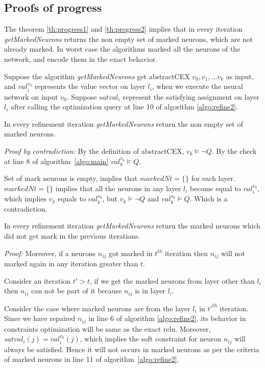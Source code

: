 \subsection{Proofs of progress}
The theorem \ref{th:progress1} and \ref{th:progress2} implies that in every iteration {\em getMarkedNeurons} 
returns the non empty set of marked neurons, which are not already marked. In worst case the algorithms marked all 
the neurons of the network, and encode them in the exact behavior. 

Suppose the algorithm {\em getMarkedNeurons} get abstractCEX 
${v_0}, {v_1}, ... {v_k}$ as input, 
and ${val_i^{{v_0}}}$ represents the value vector on layer $l_i$, 
when we execute the neural network on input ${v_0}$.
Suppose ${satval_i}$ represent the satisfying assignment on layer $l_i$ after calling the optimization 
query at line 10 of algorithm \ref{algo:refine2}. 



\begin{theorem}
  \label{th:progress1}
  In every refinement iteration {\em getMarkedNeurons} return the non empty set of marked neurons. 
\end{theorem}

{\em Proof by contradiction:} 
By the definition of abstractCEX, ${v_k} \models \lnot Q$. 
By the check at line 8 of algorithm~\ref{algo:main} ${val_k^{{v_0}}} \models Q$. 

Set of mark neurons is empty, implies that $markedNt = \{\}$ for each layer. 
$markedNt= \{\}$ implies that all the neurons in any layer $l_i$ become equal to ${val_i^{{v_0}}}$,  
which implies ${v_k}$ equals to ${val_k^{{v_0}}}$, but ${v_k} \models \lnot Q$ and 
${val_k^{{v_0}}} \models Q$. Which is a contradiction. 


\begin{theorem}
  \label{th:progress2}
  In every refinement iteration {\em getMarkedNeurons} return the marked neurons which did not get mark in the previous iterations. 
\end{theorem}

{\em Proof: } Moreover, if a neurons $n_{ij}$ got marked in $t^{th}$ iteration then $n_{ij}$ will not marked again 
in any iteration greater than $t$.

Consider an iteration $t' > t$, if we get the marked neurons from layer other than $l_i$ then $n_{ij}$ 
can not be part of it because $n_{ij}$ is in layer $l_i$. 

Consider the case where marked neurons are from the layer $l_i$ in $t'^{th}$ iteration. 
Since we have repaired $n_{ij}$ in line 6 of algorithm \ref{algo:refine2}, its behavior in constraints 
optimization will be same as the exact relu. 
Moreover, ${satval_i}(j) = {val_i^{{v_0}}}(j)$, 
which implies the soft constraint for neuron $n_{ij}$ will always be satisfied. Hence it will not occurs in 
marked neurons as per the criteria of marked neurons in line 11 of algorithm~\ref{algo:refine2}. 

